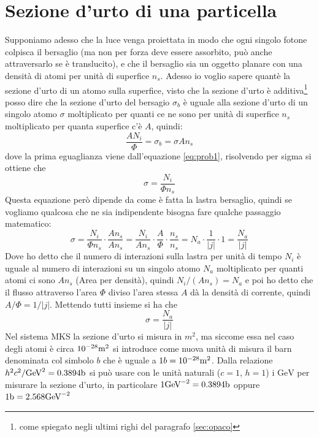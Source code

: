\documentclass[11pt,a4paper]{report}
\begin{document}
	\section{Sezione d'urto di una particella}
		Supponiamo adesso che la luce venga proiettata in modo che ogni singolo fotone colpisca il bersaglio (ma non per forza deve essere assorbito, può anche attraversarlo se è translucito), e che il bersaglio sia un oggetto planare con una densità di atomi per unità di superfice $n_s$.\newline
		Adesso io voglio sapere quantè la sezione d'urto di un atomo sulla superfice, visto che la sezione d'urto è additiva\footnote{come spiegato negli ultimi righi del paragrafo \ref{sec:opaco}} posso dire che la sezione d'urto del bersagio $\sigma_b$ è uguale alla sezione d'urto di un singolo atomo $\sigma$ moltiplicato per quanti ce ne sono per unità di superfice $n_s$ moltiplicato per quanta superfice c'è $A$, quindi:
		\[
			\frac{AN_i}\Phi=\sigma_b=\sigma A n_s
		\]
		dove la prima eguaglianza viene dall'equazione \ref{eq:prob1}, risolvendo per sigma si ottiene che 
		\begin{equation}
			\sigma=\frac{N_i}{\Phi n_s}
			\label{eq:sez_lastra}
		\end{equation}
		Questa equazione però dipende da come è fatta la lastra bersaglio, quindi se vogliamo qualcosa che ne sia indipendente bisogna fare qualche passaggio matematico:
		\[
			\sigma=\frac{N_i}{\Phi n_s}\cdot \frac{An_s}{An_s}=
			\frac{N_i}{An_s}\cdot\frac A\Phi\cdot \frac {n_s}{n_s}=
			N_a\cdot \frac1{|j|}\cdot 1=\frac{N_a}{|j|}
		\]
		Dove ho detto che il numero di interazioni sulla lastra per unità di tempo $N_i$ è uguale al numero di interazioni su un singolo atomo $N_a$ moltiplicato per quanti atomi ci sono $An_s$ (Area per densità), quindi $N_i/(An_s)=N_a$ e poi ho detto che il flusso attraverso l'area $\Phi$ diviso l'area stessa $A$ dà la densità di corrente, quindi $A/\Phi=1/|j|$.\newline
		Mettendo tutti insieme si ha che 
		\begin{equation}
			\sigma=\frac{N_a}{|j|}
		\end{equation}
		Nel sistema MKS la sezione d'urto si misura in $m^2$, ma siccome essa nel caso degli atomi è circa $10^{-28}\textrm m^2$ si introduce come nuova unità di misura il barn denominata col simbolo $b$ che è uguale a $1b=10^{-28}\textrm m^2$.\newline
		Dalla relazione $h^2c^2/\textrm {GeV}^2=0.3894\textrm b$ si può usare con le unità naturali ($c=1$, $h=1$) i $\textrm {GeV}$ per misurare la sezione d'urto, in particolare $1\textrm{GeV}^{-2}=0.3894\textrm b$ oppure $1\textrm b=2.568\textrm{GeV}^{-2}$
\end{document}
